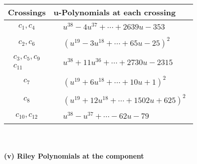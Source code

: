 \documentclass[1p]{elsarticle_modified}
\theoremstyle{definition}
\begin{document}
\begin{tabular}{m{50pt}|m{274pt}}
Crossings & \hspace{64pt}u-Polynomials at each crossing \\
\hline $$\begin{aligned}c_{1},c_{4}\end{aligned}$$&$\begin{aligned}
&u^{38}-4 u^{37}+\cdots+2639 u-353
\end{aligned}$\\
\hline $$\begin{aligned}c_{2},c_{6}\end{aligned}$$&$\begin{aligned}
&(u^{19}-3 u^{18}+\cdots+65 u-25)^{2}
\end{aligned}$\\
\hline $$\begin{aligned}c_{3},c_{5},c_{9}\\c_{11}\end{aligned}$$&$\begin{aligned}
&u^{38}+11 u^{36}+\cdots+2730 u-2315
\end{aligned}$\\
\hline $$\begin{aligned}c_{7}\end{aligned}$$&$\begin{aligned}
&(u^{19}+6 u^{18}+\cdots+10 u+1)^{2}
\end{aligned}$\\
\hline $$\begin{aligned}c_{8}\end{aligned}$$&$\begin{aligned}
&(u^{19}+12 u^{18}+\cdots+1502 u+625)^{2}
\end{aligned}$\\
\hline $$\begin{aligned}c_{10},c_{12}\end{aligned}$$&$\begin{aligned}
&u^{38}- u^{37}+\cdots-62 u-79
\end{aligned}$\\
\hline
\end{tabular}\\~\\
\newpage\renewcommand{\arraystretch}{1}
\flushleft \textbf{(v) Riley Polynomials at the component}\newline \\
\end{document}
